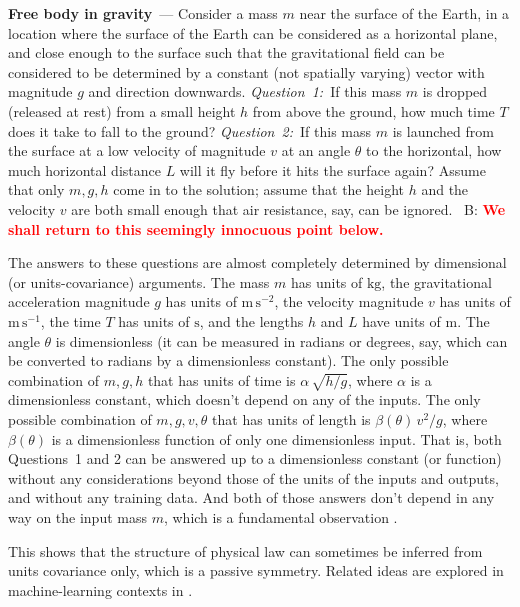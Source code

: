 \documentclass[11pt]{article}
\newcommand{\unit}[1]{\mathrm{#1}}
\newcommand{\kg}{\unit{kg}}
\newcommand{\m}{\unit{m}}
\newcommand{\s}{\unit{s}}
\renewcommand{\paragraph}[1]{\medskip\par\noindent\textbf{#1}~---}
\newcommand{\bernhard}[1]{~B: \textcolor{red}{\textbf{#1}}}
\begin{document}
\paragraph{Free body in gravity}
Consider a mass $m$ near the surface of the Earth, in a location where the surface of the Earth can be considered as a horizontal plane, and close enough to the surface such that the gravitational field can be considered to be determined by a constant (not spatially varying) vector with magnitude $g$ and direction downwards.
\textsl{Question~1:}~If this mass $m$ is dropped (released at rest) from a small height $h$ from above the ground, how much time $T$ does it take to fall to the ground?
\textsl{Question~2:}~If this mass $m$ is launched from the surface at a low velocity of magnitude $v$ at an angle $\theta$ to the horizontal, how much horizontal distance $L$ will it fly before it hits the surface again?
Assume that only $m, g, h$ come in to the solution; assume that the height $h$ and the velocity $v$ are both small enough that air resistance, say, can be ignored. \bernhard{We shall return to this seemingly innocuous point below.}

The answers to these questions are almost completely determined by dimensional (or units-covariance) arguments.
The mass $m$ has units of $\kg$, the gravitational acceleration magnitude $g$ has units of $\m\,\s^{-2}$, the velocity magnitude $v$ has units of $\m\,\s^{-1}$, the time $T$ has units of $\s$, and the lengths $h$ and $L$ have units of $\m$.
The angle $\theta$ is dimensionless (it can be measured in radians or degrees, say, which can be converted to radians by a dimensionless constant).
The only possible combination of $m, g, h$ that has units of time is $\alpha\,\sqrt{h/g}$, where $\alpha$ is a dimensionless constant, which doesn't depend on any of the inputs.
The only possible combination of $m, g, v, \theta$ that has units of length is $\beta(\theta)\,v^2/g$, where $\beta(\theta)$ is a dimensionless function of only one dimensionless input.
That is, both Questions~1 and 2 can be answered up to a dimensionless constant (or function) without any considerations beyond those of the units of the inputs and outputs, and without any training data.
And both of those answers don't depend in any way on the input mass $m$, which is a fundamental observation \cite{gr}.

This shows that the structure of physical law can sometimes be inferred from units covariance only, which is a passive symmetry.  Related ideas are explored in machine-learning contexts in \cite{villar2022dimensionless}.
\end{document}
